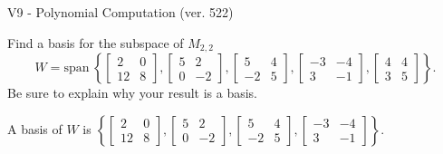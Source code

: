 \begin{exercise}
  \begin{exerciseTitle}V9 - Polynomial Computation (ver. 522)\end{exerciseTitle}
  \begin{exerciseStatement}
    Find a basis for the subspace of \(M_{2,2}\) 
\[W=\mathrm{span}\ \left\{\left[\begin{array}{cc}
2 & 0 \\
12 & 8
\end{array}\right] , \left[\begin{array}{cc}
5 & 2 \\
0 & -2
\end{array}\right] , \left[\begin{array}{cc}
5 & 4 \\
-2 & 5
\end{array}\right] , \left[\begin{array}{cc}
-3 & -4 \\
3 & -1
\end{array}\right] , \left[\begin{array}{cc}
4 & 4 \\
3 & 5
\end{array}\right]\right\}.\]
 Be sure to explain why your result is a basis.


  \end{exerciseStatement}
  \begin{exerciseAnswer}
   A basis of \(W\) is  \(\left\{\left[\begin{array}{cc}
2 & 0 \\
12 & 8
\end{array}\right] , \left[\begin{array}{cc}
5 & 2 \\
0 & -2
\end{array}\right] , \left[\begin{array}{cc}
5 & 4 \\
-2 & 5
\end{array}\right] , \left[\begin{array}{cc}
-3 & -4 \\
3 & -1
\end{array}\right]\right\}\).
  


  \end{exerciseAnswer}
\end{exercise}